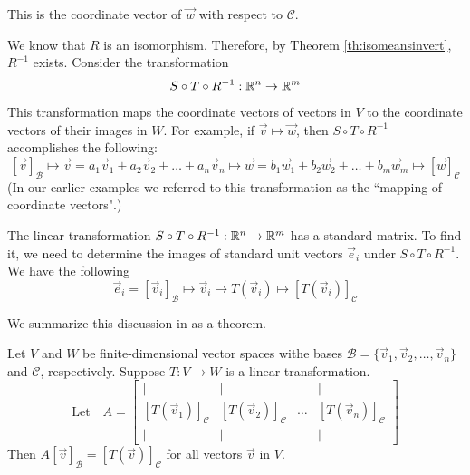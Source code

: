 \documentclass{ximera}
\begin{document}
This is the coordinate vector of $\vec{w}$ with respect to $\mathcal{C}$.

We know that $R$ is an isomorphism.  Therefore, by Theorem \ref{th:isomeansinvert}, $R^{-1}$ exists. Consider the transformation
$$S\circ T\circ R^{-1}:\mathbb{R}^n\rightarrow \mathbb{R}^m$$

\begin{center}
\end{center}

This transformation maps the coordinate vectors of vectors in $V$ to the coordinate vectors of their images in $W$.  For example, if $\vec{v}\mapsto\vec{w}$, then $S\circ T\circ R^{-1}$ accomplishes the following:
$$[\vec{v}]_{\mathcal{B}}\mapsto\vec{v}=a_1\vec{v}_1+a_2\vec{v}_2+\ldots +a_n\vec{v}_n\mapsto\vec{w}=b_1\vec{w}_1+b_2\vec{w}_2+\ldots +b_m\vec{w}_m\mapsto[\vec{w}]_{\mathcal{C}}$$
(In our earlier examples we referred to this transformation as the ``mapping of coordinate vectors".)

The linear transformation $S\circ T\circ R^{-1}:\mathbb{R}^n\rightarrow \mathbb{R}^m$ has a standard matrix.  To find it, we need to determine the images of standard unit vectors $\vec{e}_i$ under $S\circ T\circ R^{-1}$. We have the following
$$\vec{e}_i=[\vec{v}_i]_{\mathcal{B}}\mapsto \vec{v}_i \mapsto T(\vec{v}_i)\mapsto [T(\vec{v}_i)]_{\mathcal{C}}$$

We summarize this discussion in as a theorem.

\begin{theorem}\label{th:matlintransgeneral}
Let $V$ and $W$ be finite-dimensional vector spaces withe bases $\mathcal{B}=\{\vec{v}_1,\vec{v}_2,\ldots,\vec{v}_n\}$ and $\mathcal{C}$, respectively.  Suppose $T:V\rightarrow W$ is a linear transformation.  
$$\text{Let}\quad A=\begin{bmatrix}
           | & |& &|\\
		[T(\vec{v}_1)]_{\mathcal{C}} & [T(\vec{v}_2)]_{\mathcal{C}}&\dots &[T(\vec{v}_n)]_{\mathcal{C}}\\
		|&| & &|
         \end{bmatrix}$$
Then $A[\vec{v}]_{\mathcal{B}}=[T(\vec{v})]_{\mathcal{C}}$ for all vectors $\vec{v}$ in $V$.       
\end{theorem}
\end{document}
